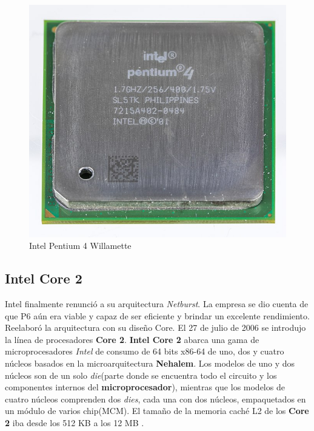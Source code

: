 \begin{figure}[htb]
	\centering
	\includegraphics[scale = 0.15]{Graphics/Pentium_4_-_SL5TK-3056.jpg}
	\caption{Intel Pentium 4 Willamette}
	\label{fig:23}
\end{figure}

\subsection{\textbf{Intel Core 2}}
Intel finalmente renunció a su arquitectura \emph{Netburst}. La empresa se dio cuenta de que P6 aún era viable y capaz de ser eficiente y brindar 
un excelente rendimiento. Reelaboró la arquitectura con su diseño Core. El 27 de julio de 2006 se introdujo la línea de procesadores \textbf{Core 2}.
\textbf{Intel Core 2} abarca una gama de microprocesadores \emph{Intel} de consumo de 64 bits x86-64 de uno, dos y cuatro 
núcleos basados en la microarquitectura \textbf{Nehalem}. Los modelos de uno y dos núcleos son de un solo \emph{die}(parte donde se encuentra 
todo el circuito y los componentes internos del \textbf{microprocesador}), mientras que los modelos de cuatro núcleos comprenden dos \emph{dies}, cada una con dos núcleos, 
empaquetados en un módulo de varios chip(MCM). El tamaño de la memoria caché  L2 de los \textbf{Core 2} iba desde los 512 KB a los 
12 MB .


